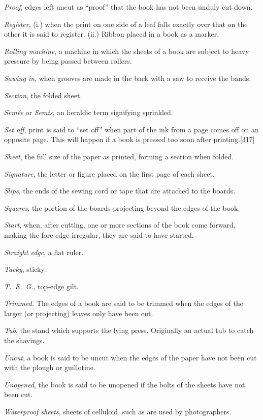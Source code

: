 \documentclass[
]{article}
\begin{document}
\emph{Proof}, edges left uncut as ``proof'' that the book has not been
unduly cut down.

\emph{Register}, (i.) when the print on one side of a leaf falls exactly
over that on the other it is said to register. (ii.) Ribbon placed in a
book as a marker.

\emph{Rolling machine}, a machine in which the sheets of a book are
subject to heavy pressure by being passed between rollers.

\emph{Sawing in}, when grooves are made in the back with a saw to
receive the bands.

\emph{Section}, the folded sheet.

\emph{Semée} or \emph{Semis}, an heraldic term signifying sprinkled.

\emph{Set off}, print is said to ``set off'' when part of the ink from a
page comes off on an opposite page. This will happen if a book is
pressed too soon after
printing.{\protect\hypertarget{Page_317}{}{{[}317{]}}}

\emph{Sheet}, the full size of the paper as printed, forming a section
when folded.

\emph{Signature}, the letter or figure placed on the first page of each
sheet.

\emph{Slips}, the ends of the sewing cord or tape that are attached to
the boards.

\emph{Squares}, the portion of the boards projecting beyond the edges of
the book.

\emph{Start}, when, after cutting, one or more sections of the book come
forward, making the fore edge irregular, they are said to have started.

\emph{Straight edge}, a flat ruler.

\emph{Tacky}, sticky.

\emph{T.~E.~G.}, top-edge gilt.

\emph{Trimmed.} The edges of a book are said to be trimmed when the
edges of the larger (or projecting) leaves only have been cut.

\emph{Tub}, the stand which supports the lying press. Originally an
actual tub to catch the shavings.

\emph{Uncut}, a book is said to be uncut when the edges of the paper
have not been cut with the plough or guillotine.

\emph{Unopened}, the book is said to be unopened if the bolts of the
sheets have not been cut.

\emph{Waterproof sheets}, sheets of celluloid, such as are used by
photographers.
\end{document}
